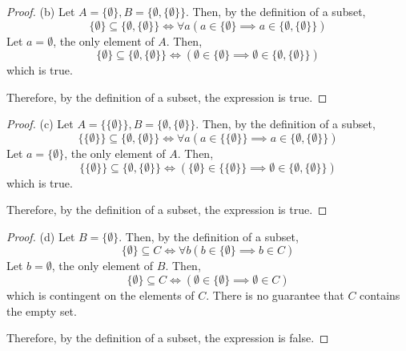 \documentclass[10pt]{article}
\theoremstyle{definition}
\theoremstyle{definition}
\theoremstyle{plain}
\begin{document}
\begin{proof}{(b)}
Let $A=\{\emptyset\}, B = \{\emptyset,\{\emptyset\}\}$. Then, by the definition of a subset,
\begin{equation*}
\{\emptyset\} \subseteq \{\emptyset,\{\emptyset\}\} \iff \forall a(a\in \{\emptyset\} \implies a\in \{\emptyset,\{\emptyset\}\})
\end{equation*}
Let $a=\emptyset$, the only element of $A$. Then,
\begin{equation*}
\{\emptyset\} \subseteq \{\emptyset,\{\emptyset\}\} \iff (\emptyset \in \{\emptyset\} \implies \emptyset \in \{\emptyset,\{\emptyset\}\})
\end{equation*}
which is true.

\noindent Therefore, by the definition of a subset, the expression is true.
\end{proof}

\begin{proof}{(c)}
Let $A=\{\{\emptyset\}\}, B = \{\emptyset,\{\emptyset\}\}$. Then, by the definition of a subset,
\begin{equation*}
\{\{\emptyset\}\} \subseteq \{\emptyset,\{\emptyset\}\} \iff \forall a(a\in \{\{\emptyset\}\} \implies a\in \{\emptyset,\{\emptyset\}\})
\end{equation*}
Let $a=\{\emptyset\}$, the only element of $A$. Then,
\begin{equation*}
\{\{\emptyset\}\} \subseteq \{\emptyset,\{\emptyset\}\} \iff (\{\emptyset\} \in \{\{\emptyset\}\} \implies \emptyset \in \{\emptyset,\{\emptyset\}\})
\end{equation*}
which is true.

\bigskip

\noindent Therefore, by the definition of a subset, the expression is true.
\end{proof}


\begin{proof}{(d)}
Let $B=\{\emptyset\}$. Then, by the definition of a subset,
\begin{equation*}
\{\emptyset\} \subseteq C \iff \forall b(b\in \{\emptyset\} \implies b\in C)
\end{equation*}
Let $b=\emptyset$, the only element of $B$. Then,
\begin{equation*}
\{\emptyset\} \subseteq C \iff (\emptyset \in \{\emptyset\} \implies \emptyset \in C)
\end{equation*}
which is contingent on the elements of $C$. There is no guarantee that $C$ contains the empty set.

\bigskip

\noindent Therefore, by the definition of a subset, the expression is false.
\end{proof}
\end{document}
